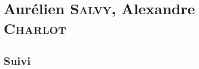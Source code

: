 \documentclass[a4paper, 11pt, final, garamond]{book}
\begin{document}
%
%
%
%
%

\chapter{Aurélien \textsc{Salvy}, Alexandre \textsc{Charlot}}
\label{ch:salvycharlot}

\section{Suivi}
\end{document}
